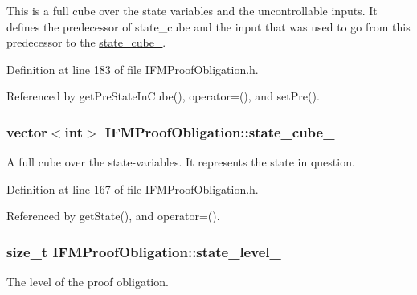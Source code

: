 This is a full cube over the state variables and the uncontrollable inputs. It defines the predecessor of state\-\_\-cube and the input that was used to go from this predecessor to the \hyperlink{classIFMProofObligation_a688b714ebad4010c14e11355a73faf3c}{state\-\_\-cube\-\_\-}. 

Definition at line 183 of file I\-F\-M\-Proof\-Obligation.\-h.



Referenced by get\-Pre\-State\-In\-Cube(), operator=(), and set\-Pre().

\hypertarget{classIFMProofObligation_a688b714ebad4010c14e11355a73faf3c}{
\subsubsection[{state\-\_\-cube\-\_\-}]{\setlength{\rightskip}{0pt plus 5cm}vector$<$int$>$ I\-F\-M\-Proof\-Obligation\-::state\-\_\-cube\-\_\-\hspace{0.3cm}{\ttfamily [protected]}}}\label{classIFMProofObligation_a688b714ebad4010c14e11355a73faf3c}


A full cube over the state-\/variables. It represents the state in question. 



Definition at line 167 of file I\-F\-M\-Proof\-Obligation.\-h.



Referenced by get\-State(), and operator=().

\hypertarget{classIFMProofObligation_a6207c16b84a41450a8ca31ed8a35b4ea}{
\subsubsection[{state\-\_\-level\-\_\-}]{\setlength{\rightskip}{0pt plus 5cm}size\-\_\-t I\-F\-M\-Proof\-Obligation\-::state\-\_\-level\-\_\-\hspace{0.3cm}{\ttfamily [protected]}}}\label{classIFMProofObligation_a6207c16b84a41450a8ca31ed8a35b4ea}


The level of the proof obligation. 

